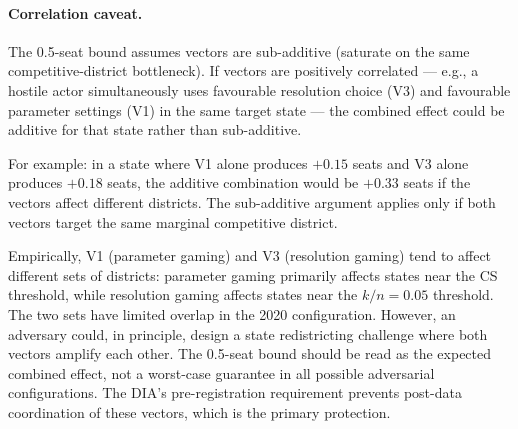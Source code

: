 \paragraph{Correlation caveat.}
The 0.5-seat bound assumes vectors are sub-additive (saturate on the same
competitive-district bottleneck). If vectors are positively correlated ---
e.g., a hostile actor simultaneously uses favourable resolution choice (V3)
and favourable parameter settings (V1) in the same target state --- the combined
effect could be additive for that state rather than sub-additive.

For example: in a state where V1 alone produces $+0.15$ seats and V3 alone
produces $+0.18$ seats, the additive combination would be $+0.33$ seats if
the vectors affect different districts. The sub-additive argument applies
only if both vectors target the same marginal competitive district.

Empirically, V1 (parameter gaming) and V3 (resolution gaming) tend to affect
different sets of districts: parameter gaming primarily affects states near the
CS threshold, while resolution gaming affects states near the $k/n = 0.05$
threshold. The two sets have limited overlap in the 2020 configuration.
However, an adversary could, in principle, design a state redistricting challenge
where both vectors amplify each other. The 0.5-seat bound should be read as
the expected combined effect, not a worst-case guarantee in all possible adversarial
configurations. The DIA's pre-registration requirement prevents post-data
coordination of these vectors, which is the primary protection.

